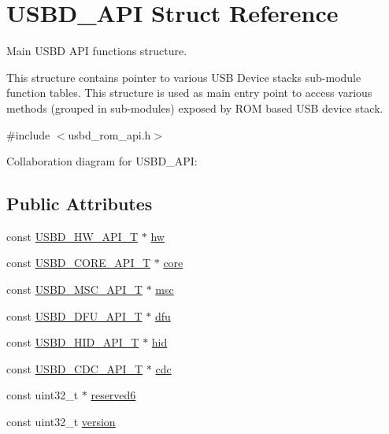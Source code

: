 \hypertarget{struct_u_s_b_d___a_p_i}{}\section{U\+S\+B\+D\+\_\+\+A\+PI Struct Reference}
\label{struct_u_s_b_d___a_p_i}


Main U\+S\+BD A\+PI functions structure.

This structure contains pointer to various U\+SB Device stack\textquotesingle{}s sub-\/module function tables. This structure is used as main entry point to access various methods (grouped in sub-\/modules) exposed by R\+OM based U\+SB device stack.  




{\ttfamily \#include $<$usbd\+\_\+rom\+\_\+api.\+h$>$}



Collaboration diagram for U\+S\+B\+D\+\_\+\+A\+PI\+:
\subsection*{Public Attributes}
\begin{DoxyCompactItemize}
\item 
const \hyperlink{group___u_s_b_d___h_w_ga4df5b7beaddc4e9267c320d92b4434fc}{U\+S\+B\+D\+\_\+\+H\+W\+\_\+\+A\+P\+I\+\_\+T} $\ast$ \hyperlink{struct_u_s_b_d___a_p_i_a80f452bd8ff7fdff6fb835beb5e3255c}{hw}
\item 
const \hyperlink{group___u_s_b_d___core_ga6a53e8395d1c68f98d18ca4a49b75baa}{U\+S\+B\+D\+\_\+\+C\+O\+R\+E\+\_\+\+A\+P\+I\+\_\+T} $\ast$ \hyperlink{struct_u_s_b_d___a_p_i_a52b343de8166692bd2b4aecfb5eea59d}{core}
\item 
const \hyperlink{group___u_s_b_d___m_s_c_ga521bb0e0edf4060aeb10827c6c29f7cf}{U\+S\+B\+D\+\_\+\+M\+S\+C\+\_\+\+A\+P\+I\+\_\+T} $\ast$ \hyperlink{struct_u_s_b_d___a_p_i_a0a7fefe527769345f3565fba289c8358}{msc}
\item 
const \hyperlink{group___u_s_b_d___d_f_u_gadf9281f8af1223053e3ccf48e26ac80d}{U\+S\+B\+D\+\_\+\+D\+F\+U\+\_\+\+A\+P\+I\+\_\+T} $\ast$ \hyperlink{struct_u_s_b_d___a_p_i_ade2d145690a4684babfc683b9cdec47f}{dfu}
\item 
const \hyperlink{group___u_s_b_d___h_i_d_ga48d7b7f66a852d99dfbe2c419cc408ba}{U\+S\+B\+D\+\_\+\+H\+I\+D\+\_\+\+A\+P\+I\+\_\+T} $\ast$ \hyperlink{struct_u_s_b_d___a_p_i_add4c43d092004fe92e77152d970e877b}{hid}
\item 
const \hyperlink{group___u_s_b_d___c_d_c_gaad7f61aed01ad4130bee0f50b17eb716}{U\+S\+B\+D\+\_\+\+C\+D\+C\+\_\+\+A\+P\+I\+\_\+T} $\ast$ \hyperlink{struct_u_s_b_d___a_p_i_a5560686e2f376096d2e1a640bb16bb84}{cdc}
\item 
const uint32\+\_\+t $\ast$ \hyperlink{struct_u_s_b_d___a_p_i_a4761deeab24d9655d4ab471dee37fe9a}{reserved6}
\item 
const uint32\+\_\+t \hyperlink{struct_u_s_b_d___a_p_i_a900209612d9df086dd044b630607955b}{version}
\end{DoxyCompactItemize}


